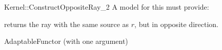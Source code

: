 \begin{ccRefFunctionObjectConcept}{Kernel::ConstructOppositeRay_2}
A model for this must provide:


{returns the ray with the same source as $r$, but in opposite direction.}

\ccRefines
AdaptableFunctor (with one argument)

\ccSeeAlso
{} \\

\end{ccRefFunctionObjectConcept}
